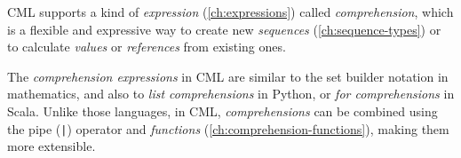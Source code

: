 CML supports a kind of \emph{expression} (\ref{ch:expressions})
called \emph{comprehension},
which is a flexible and expressive way
to create new \emph{sequences} (\ref{ch:sequence-types})
or to calculate \emph{values} or \emph{references} from existing ones.

The \emph{comprehension expressions} in CML are similar to the
set builder notation in mathematics,
and also to \emph{list comprehensions} in Python,
or \emph{for comprehensions} in Scala.
Unlike those languages, in CML,
\emph{comprehensions} can be combined using the pipe (\verb!|!) operator
and \emph{functions} (\ref{ch:comprehension-functions}),
making them more extensible.
